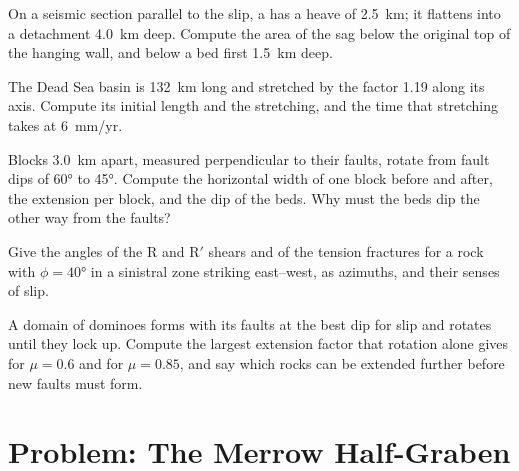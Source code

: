 \begin{exercise}[$\star\star$]\label{exo:b3:extension-strike-slip:8}
On a seismic section parallel to the slip, a  has a heave of
\qty{2.5}{km}; it flattens into a detachment \qty{4.0}{km} deep. Compute the
area of the sag below the original top of the hanging wall, and below a bed
first \qty{1.5}{km} deep.
\end{exercise}

\begin{exercise}[$\star\star$]\label{exo:b3:extension-strike-slip:9}
The Dead Sea basin is \qty{132}{km} long and stretched by the factor 1.19
along its axis. Compute its initial length and the stretching, and the time
that stretching takes at \qty{6}{mm/yr}.
\end{exercise}

\begin{exercise}[$\star\star\star$]\label{exo:b3:extension-strike-slip:10}
Blocks \qty{3.0}{km} apart, measured perpendicular to their faults, rotate
from fault dips of \ang{60} to \ang{45}. Compute the horizontal width of one
block before and after, the extension per block, and the dip of the beds.
Why must the beds dip the other way from the faults?
\end{exercise}

\begin{exercise}[$\star\star\star$]\label{exo:b3:extension-strike-slip:11}
Give the angles of the R and R$'$ shears and of the tension fractures for a
rock with $\phi = \ang{40}$ in a sinistral zone striking east--west, as
azimuths, and their senses of slip.
\end{exercise}

\begin{exercise}[$\star\star\star$]\label{exo:b3:extension-strike-slip:12}
A domain of dominoes forms with its faults at the best dip for slip and
rotates until they lock up. Compute the largest extension factor that
rotation alone gives for $\mu = 0.6$ and for $\mu = 0.85$, and say which
rocks can be extended further before new faults must form.
\end{exercise}

\section{Problem: The Merrow Half-Graben}

